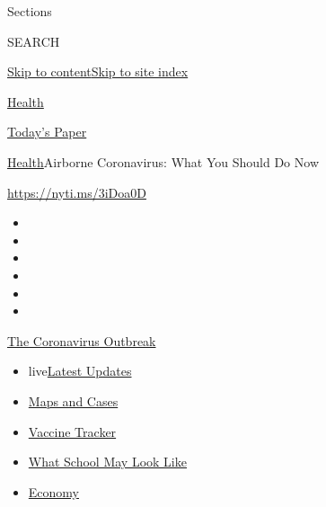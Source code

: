 Sections

SEARCH

\protect\hyperlink{site-content}{Skip to
content}\protect\hyperlink{site-index}{Skip to site index}

\href{https://www.nytimes3xbfgragh.onion/section/health}{Health}

\href{https://myaccount.nytimes3xbfgragh.onion/auth/login?response_type=cookie\&client_id=vi}{}

\href{https://www.nytimes3xbfgragh.onion/section/todayspaper}{Today's
Paper}

\href{/section/health}{Health}\textbar{}Airborne Coronavirus: What You
Should Do Now

\url{https://nyti.ms/3iDoa0D}

\begin{itemize}
\item
\item
\item
\item
\item
\item
\end{itemize}

\href{https://www.nytimes3xbfgragh.onion/news-event/coronavirus?action=click\&pgtype=Article\&state=default\&region=TOP_BANNER\&context=storylines_menu}{The
Coronavirus Outbreak}

\begin{itemize}
\tightlist
\item
  live\href{https://www.nytimes3xbfgragh.onion/2020/08/02/world/coronavirus-updates.html?action=click\&pgtype=Article\&state=default\&region=TOP_BANNER\&context=storylines_menu}{Latest
  Updates}
\item
  \href{https://www.nytimes3xbfgragh.onion/interactive/2020/us/coronavirus-us-cases.html?action=click\&pgtype=Article\&state=default\&region=TOP_BANNER\&context=storylines_menu}{Maps
  and Cases}
\item
  \href{https://www.nytimes3xbfgragh.onion/interactive/2020/science/coronavirus-vaccine-tracker.html?action=click\&pgtype=Article\&state=default\&region=TOP_BANNER\&context=storylines_menu}{Vaccine
  Tracker}
\item
  \href{https://www.nytimes3xbfgragh.onion/interactive/2020/07/29/us/schools-reopening-coronavirus.html?action=click\&pgtype=Article\&state=default\&region=TOP_BANNER\&context=storylines_menu}{What
  School May Look Like}
\item
  \href{https://www.nytimes3xbfgragh.onion/live/2020/07/31/business/stock-market-today-coronavirus?action=click\&pgtype=Article\&state=default\&region=TOP_BANNER\&context=storylines_menu}{Economy}
\end{itemize}

